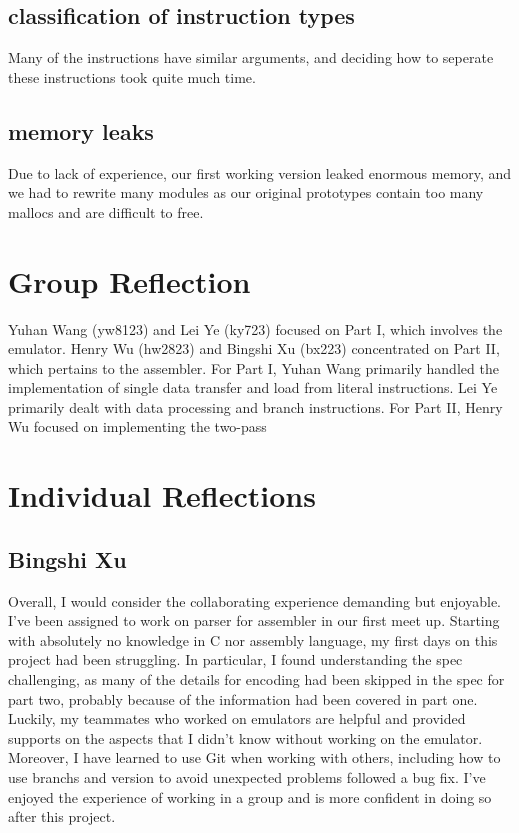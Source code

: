 \documentclass[11pt]{article}
\begin{document}
\subsection{classification of instruction types}
Many of the instructions have similar arguments, and deciding how to seperate these instructions took quite much time.
\subsection{memory leaks}
Due to lack of experience, our first working version leaked enormous memory, and we had to rewrite many modules as our original prototypes contain too many mallocs and are difficult to free.


\section{Group Reflection}

Yuhan Wang (yw8123) and Lei Ye (ky723) focused on Part I, which involves the emulator. Henry Wu (hw2823) and Bingshi Xu (bx223) concentrated on Part II, which pertains to the assembler.
For Part I, Yuhan Wang primarily handled the implementation of single data transfer and load from literal instructions. Lei Ye primarily dealt with data processing and branch instructions.
For Part II, Henry Wu focused on implementing the two-pass 

\section{Individual Reflections}

\subsection{Bingshi Xu}
Overall, I would consider the collaborating experience demanding but enjoyable. I've been assigned to work on parser for assembler in our first meet up.
Starting with absolutely no knowledge in C nor assembly language, my first days on this project had been struggling. 
In particular, I found understanding the spec challenging, as many of the details for encoding had been skipped in the spec for part two, probably because of 
the information had been covered in part one. 
Luckily, my teammates who worked on emulators are helpful and provided supports on the aspects that I didn't know without working on the emulator.
Moreover, I have learned to use Git when working with others, including how to use branchs and version to avoid unexpected problems followed a bug fix.
I've enjoyed the experience of working in a group and is more confident in doing so after this project.  
\end{document}

